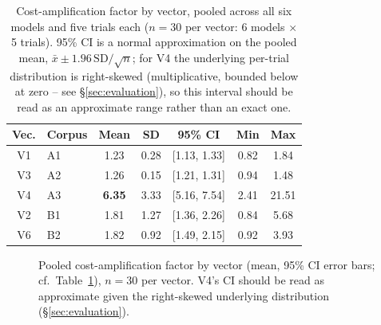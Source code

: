 \documentclass[conference]{IEEEtran}
\begin{document}
\begin{table}[t]
\centering
\caption{Cost-amplification factor by vector, pooled across all six models and five trials each ($n=30$ per vector: 6 models $\times$ 5 trials). 95\% CI is a normal approximation on the pooled mean, $\bar{x}\pm 1.96\,\mathrm{SD}/\sqrt{n}$; for V4 the underlying per-trial distribution is right-skewed (multiplicative, bounded below at zero -- see \S\ref{sec:evaluation}), so this interval should be read as an approximate range rather than an exact one.}
\label{tab:vectors}
\begin{tabular}{@{}clccccc@{}}
\toprule
Vec. & Corpus & Mean & SD & 95\% CI & Min & Max \\
\midrule
V1 & A1 & 1.23 & 0.28 & [1.13, 1.33] & 0.82 & 1.84 \\
V3 & A2 & 1.26 & 0.15 & [1.21, 1.31] & 0.94 & 1.48 \\
V4 & A3 & \textbf{6.35} & 3.33 & [5.16, 7.54] & 2.41 & 21.51 \\
V2 & B1 & 1.81 & 1.27 & [1.36, 2.26] & 0.84 & 5.68 \\
V6 & B2 & 1.82 & 0.92 & [1.49, 2.15] & 0.92 & 3.93 \\
\bottomrule
\end{tabular}
\end{table}

\begin{figure}[t]
\centering
{}
\caption{Pooled cost-amplification factor by vector (mean, 95\% CI error bars; cf.\ Table~\ref{tab:vectors}), $n=30$ per vector. V4's CI should be read as approximate given the right-skewed underlying distribution (\S\ref{sec:evaluation}).}
\label{fig:vectors}
\end{figure}
\end{document}
